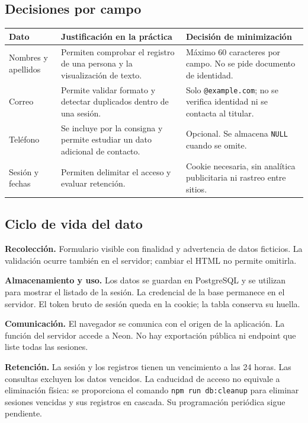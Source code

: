 \documentclass[11pt,a4paper]{article}
\begin{document}
\subsection{Decisiones por campo}
\begin{tabularx}{\textwidth}{@{}P{2.4cm}YY@{}}
\toprule
\textbf{Dato} & \textbf{Justificación en la práctica} & \textbf{Decisión de minimización}\\
\midrule
Nombres y apellidos & Permiten comprobar el registro de una persona y la visualización de texto. & Máximo 60 caracteres por campo. No se pide documento de identidad.\\
Correo & Permite validar formato y detectar duplicados dentro de una sesión. & Solo \texttt{@example.com}; no se verifica identidad ni se contacta al titular.\\
Teléfono & Se incluye por la consigna y permite estudiar un dato adicional de contacto. & Opcional. Se almacena \texttt{NULL} cuando se omite.\\
Sesión y fechas & Permiten delimitar el acceso y evaluar retención. & Cookie necesaria, sin analítica publicitaria ni rastreo entre sitios.\\
\bottomrule
\end{tabularx}

\subsection{Ciclo de vida del dato}
\textbf{Recolección.} Formulario visible con finalidad y advertencia de datos ficticios. La validación ocurre también en el servidor; cambiar el HTML no permite omitirla.

\textbf{Almacenamiento y uso.} Los datos se guardan en PostgreSQL y se utilizan para mostrar el listado de la sesión. La credencial de la base permanece en el servidor. El token bruto de sesión queda en la cookie; la tabla conserva su huella.

\textbf{Comunicación.} El navegador se comunica con el origen de la aplicación. La función del servidor accede a Neon. No hay exportación pública ni endpoint que liste todas las sesiones.

\textbf{Retención.} La sesión y los registros tienen un vencimiento a las 24 horas. Las consultas excluyen los datos vencidos. La caducidad de acceso no equivale a eliminación física: se proporciona el comando \texttt{npm run db:cleanup} para eliminar sesiones vencidas y sus registros en cascada. Su programación periódica sigue pendiente.
\end{document}
